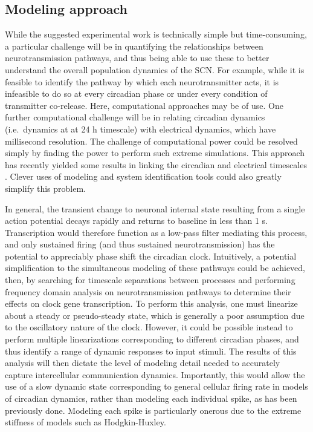 \subsection*{Modeling approach}
While the suggested experimental work is technically simple but time-consuming, a particular challenge will be in quantifying the relationships between neurotransmission pathways, and thus being able to use these to better understand the overall population dynamics of the SCN.
For example, while it is feasible to identify the pathway by which each neurotransmitter acts, it is infeasible to do so at every circadian phase or under every condition of transmitter co-release.
Here, computational approaches may be of use.
One further computational challenge will be in relating circadian dynamics (i.e.\ dynamics at at 24 h timescale) with electrical dynamics, which have millisecond resolution.
The challenge of computational power could be resolved simply by finding the power to perform such extreme simulations.
This approach has recently yielded some results in linking the circadian and electrical timescales \cite{DeWoskin2015}.
Clever uses of modeling and system identification tools could also greatly simplify this problem.

In general, the transient change to neuronal internal state resulting from a single action potential decays rapidly and returns to baseline in less than 1 s.
Transcription would therefore function as a low-pass filter mediating this process, and only sustained firing (and thus sustained neurotransmission) has the potential to appreciably phase shift the circadian clock.
Intuitively, a potential simplification to the simultaneous modeling of these pathways could be achieved, then, by searching for timescale separations between processes and performing frequency domain analysis on neurotransmission pathways to determine their effects on clock gene transcription.
To perform this analysis, one must linearize about a steady or pseudo-steady state, which is generally a poor assumption due to the oscillatory nature of the clock.
However, it could be possible instead to perform multiple linearizations corresponding to different circadian phases, and thus identify a range of dynamic responses to input stimuli.
The results of this analysis will then dictate the level of modeling detail needed to accurately capture intercellular communication dynamics.
Importantly, this would allow the use of a slow dynamic state corresponding to general cellular firing rate in models of circadian dynamics, rather than modeling each individual spike, as has been previously done.
Modeling each spike is particularly onerous due to the extreme stiffness of models such as Hodgkin-Huxley.




